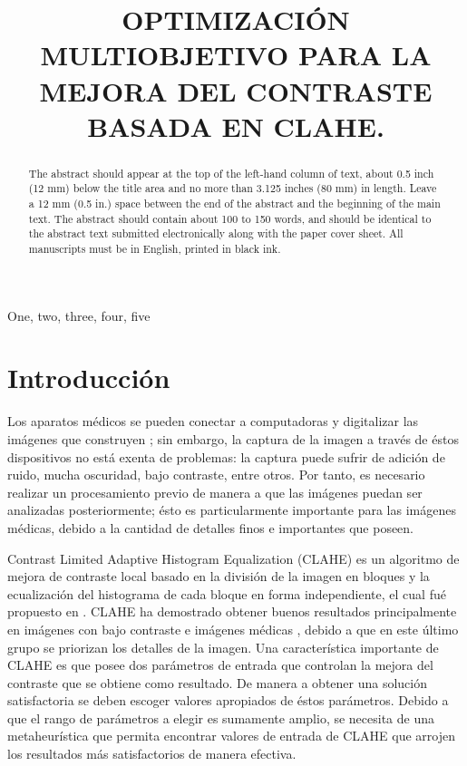\documentclass[spanish]{article}
\title{OPTIMIZACIÓN MULTIOBJETIVO PARA LA MEJORA DEL CONTRASTE BASADA EN CLAHE.}
\begin{document}
%
\maketitle
%
\begin{abstract}
The abstract should appear at the top of the left-hand column of text, about
0.5 inch (12 mm) below the title area and no more than 3.125 inches (80 mm) in
length.  Leave a 12 mm (0.5 in.) space between the end of the abstract and the
beginning of the main text.  The abstract should contain about 100 to 150
words, and should be identical to the abstract text submitted electronically
along with the paper cover sheet.  All manuscripts must be in English, printed
in black ink.
\end{abstract}
%
\begin{keywords}
One, two, three, four, five
\end{keywords}
%
\section{Introducción}
\label{sec:intro}

Los aparatos médicos se pueden conectar a computadoras y digitalizar las imágenes que construyen \cite{garcia_fenoll,russ2010}; sin embargo, la captura de la imagen a través de éstos dispositivos no está exenta de problemas: la captura puede sufrir de adición de ruido, mucha oscuridad, bajo contraste, entre otros. Por tanto, es necesario realizar un procesamiento previo de manera a que las imágenes puedan ser analizadas posteriormente; ésto es particularmente importante para las imágenes médicas, debido a la cantidad de detalles finos e importantes que poseen.

Contrast Limited Adaptive Histogram Equalization (CLAHE) es un algoritmo de mejora de contraste local basado en la división de la imagen en bloques y la ecualización del histograma de cada bloque en forma independiente, el cual fué propuesto en \cite{Zuiderveld:1994:CLA:180895.180940}. CLAHE ha demostrado obtener buenos resultados principalmente en imágenes con bajo contraste \cite{balvant2011} e imágenes médicas \cite{saikat2011,shelda2013}, debido a que en este último grupo se priorizan los detalles de la imagen. Una característica importante de CLAHE es que posee dos parámetros de entrada que controlan la mejora del contraste que se obtiene como resultado. De manera a obtener una solución satisfactoria se deben escoger valores apropiados de éstos parámetros. Debido a que el rango de parámetros a elegir es sumamente amplio, se necesita de una metaheurística que permita encontrar valores de entrada de CLAHE que arrojen los resultados más satisfactorios de manera efectiva.
\end{document}
